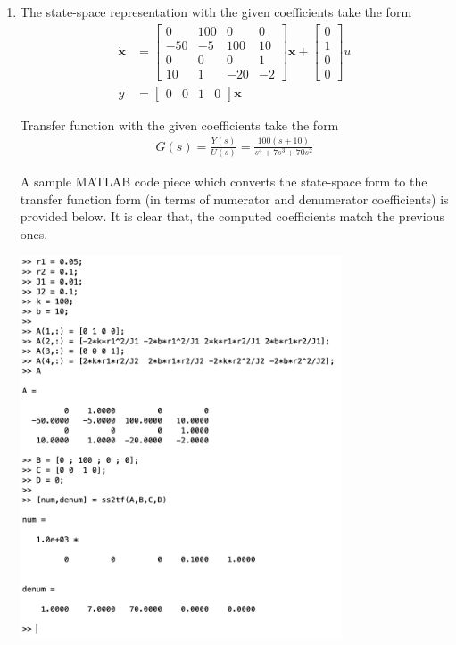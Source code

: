\documentclass[twoside]{article}
\theoremstyle{definition}
\begin{document}
\begin{enumerate}
\item The state-space representation with the given coefficients take the form
%
 \begin{align*}
\dot{\mathbf{x}} &= \left[ \begin{array}{cccc} 0 & 100 & 0 & 0 \\
-50 & -5 & 100 & 10
\\
0 & 0 & 0 & 1 \\
10 & 1 & -20 & -2
\end{array} \right] \mathbf{x} +
                   \left[ \begin{array}{c} 0 \\ 1 \\ 0 \\
                            0 \end{array} \right] u
\\
y &= \left[ \begin{array}{cccc} 0 & 0 & 1 & 0 \end{array} \right] \mathbf{x} 
\end{align*}

Transfer function with the given coefficients take the form
%
 \begin{align*}
 G(s) = \frac{Y(s)}{U(s)} = \frac{100 (s + 10)}{s^4 + 7 s^3 + 70 s^2}
 \end{align*}
 
A sample MATLAB code piece which converts the state-space form to the transfer function form
(in terms of numerator and denumerator coefficients) is provided below. It is clear that, the computed
coefficients match the previous ones. 
 
     \vspace{12pt}
    
\begin{minipage}[h]{1\linewidth}
    \begin{center}
      \includegraphics[width=0.75\textwidth]{matlabver}
    \end{center}
\end{minipage}


\end{enumerate}
\end{document}

